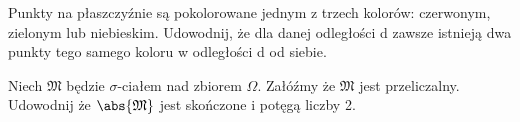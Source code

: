 \documentclass[11pt]{scrartcl}
\author{szymon ulica™}
\begin{document}
    \begin{zadanie*}
        Punkty na płaszczyźnie są pokolorowane jednym z trzech kolorów: czerwonym, zielonym lub niebieskim. Udowodnij, że dla danej odległości d zawsze istnieją dwa punkty tego samego koloru w odległości d od siebie.
    \end{zadanie*}

    \vfill
    \begin{zadanie*}
    Niech $\mathfrak{M}$ będzie $\sigma$-ciałem nad zbiorem $\Omega$. Załóźmy że $\mathfrak{M}$ jest przeliczalny. Udowodnij że $\abs{\mathfrak{M}} $ jest skończone i potęgą liczby 2.
    \end{zadanie*}
    \vspace{0.4\textheight}
    
\end{document}
